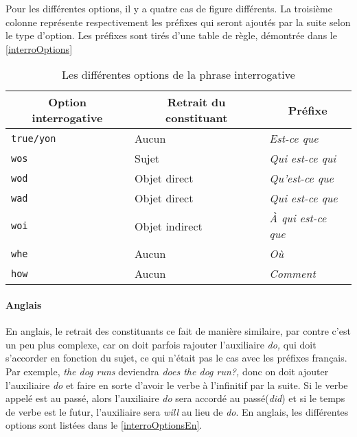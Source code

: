 \documentclass[11pt]{article} %
\newcommand{\real}[1]{\emph{#1}}
\begin{document}
Pour les différentes options, il y a quatre cas de figure différents.
La troisième colonne représente respectivement les préfixes qui seront
ajoutés par la suite selon le type d'option. Les préfixes sont tirés
d'une table de règle, démontrée dans le \autoref{interroOptions} 
\begin{table}[ht]
\centering
\caption{Les différentes options de la phrase interrogative}
\begin{tabular}{|l|l|l|}
\hline 
\multicolumn{1}{|c}{Option interrogative} & \multicolumn{1}{|c}{Retrait du constituant} & \multicolumn{1}{|c|}{Préfixe}\\
\hline 
\hline 
\texttt{true/yon} & Aucun & \real{Est-ce que}\\
\hline 
\texttt{wos} & Sujet & \real{Qui est-ce qui}\\
\hline 
\texttt{wod} & Objet direct & \real{Qu'est-ce que}\\
\hline 
\texttt{wad} & Objet direct & \real{Qui est-ce que}\\
\hline 
\texttt{woi} & Objet indirect & \real{À qui est-ce que}\\
\hline 
\texttt{whe} & Aucun & \real{Où}\\
\hline 
\texttt{how} & Aucun & \real{Comment}\\
\hline 
\end{tabular}
\label{interroOptions}
\end{table}


\paragraph{Anglais}

En anglais, le retrait des constituants ce fait de manière similaire,
par contre c'est un peu plus complexe, car on doit parfois rajouter
l'auxiliaire \emph{do, }qui doit s'accorder en fonction du sujet,
ce qui n'était pas le cas avec les préfixes français.\emph{ }Par exemple,
\emph{the dog runs} deviendra \emph{does the dog run?, }donc on doit
ajouter l'auxiliaire \emph{do }et faire en sorte d'avoir le verbe
à l'infinitif par la suite. Si le verbe appelé est au passé, alors
l'auxiliaire \emph{do }sera accordé au passé(\emph{did}) et si le
temps de verbe est le futur, l'auxiliaire sera \emph{will }au lieu
de \emph{do}. En anglais, les différentes options sont listées dans 
le \autoref{interroOptionsEn}.
\end{document}
